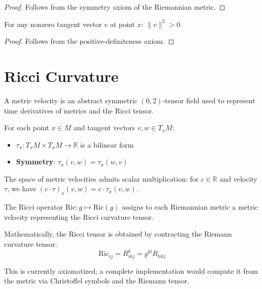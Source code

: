 \begin{proof}
\leanok
{}
Follows from the symmetry axiom of the Riemannian metric.
\end{proof}

\begin{lemma}
\label{lem:norm_sq_pos}
\leanok
{}
For any nonzero tangent vector $v$ at point $x$: $\|v\|^2 > 0$.
\end{lemma}

\begin{proof}
\leanok
{}
Follows from the positive-definiteness axiom.
\end{proof}

\chapter{Ricci Curvature}
\label{chap:ricci}

\begin{definition}
\label{def:metric_velocity}
\leanok
{}
A metric velocity is an abstract symmetric $(0,2)$-tensor field used to represent time derivatives of metrics and the Ricci tensor.

For each point $x \in M$ and tangent vectors $v, w \in T_xM$:
\begin{itemize}
\item $\tau_x : T_xM \times T_xM \to \mathbb{R}$ is a bilinear form
\item \textbf{Symmetry}: $\tau_x(v, w) = \tau_x(w, v)$
\end{itemize}

The space of metric velocities admits scalar multiplication: for $c \in \mathbb{R}$ and velocity $\tau$, we have $(c \cdot \tau)_x(v,w) = c \cdot \tau_x(v,w)$.
\end{definition}

\begin{definition}
\label{def:ricci_of_metric}
The Ricci operator $\mathrm{Ric} : g \mapsto \mathrm{Ric}(g)$ assigns to each Riemannian metric a metric velocity representing the Ricci curvature tensor.

Mathematically, the Ricci tensor is obtained by contracting the Riemann curvature tensor:
\[ \mathrm{Ric}_{ij} = R^k_{ikj} = g^{kl} R_{likj} \]

This is currently axiomatized; a complete implementation would compute it from the metric via Christoffel symbols and the Riemann tensor.
\end{definition}

